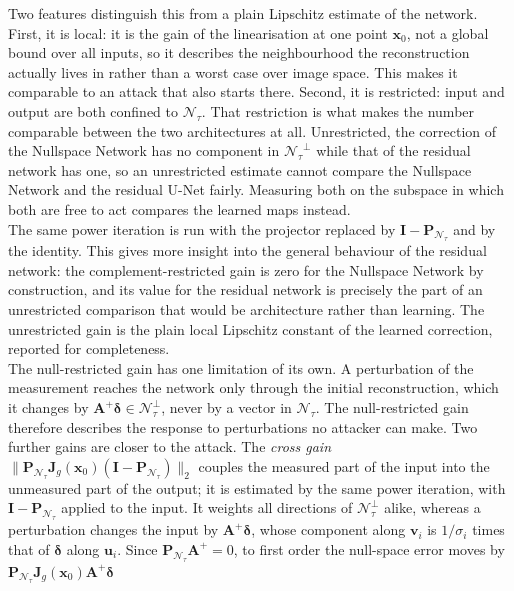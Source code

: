 \documentclass{article}
\numberwithin{equation}{section}
\begin{document}
Two features distinguish this from a plain Lipschitz estimate of the network.
First, it is local: it is the gain of the linearisation at one point
$\mathbf{x}_0$, not a global bound over all inputs, so it describes the
neighbourhood the reconstruction actually lives in rather than a worst case over
image space. This makes it comparable to an attack that also starts
there. Second, it is restricted: input and output are both confined to
$\mathcal{N}_\tau$. That restriction is what makes the number comparable
between the two architectures at all. Unrestricted, the correction of the Nullspace Network has no
component in ${\mathcal{N}_\tau}^{\perp}$ while that of the residual network has one,
so an unrestricted estimate cannot compare the Nullspace Network and the residual U-Net fairly.
Measuring both on the subspace in which both are free to act compares the learned maps instead.\\
The same power iteration is run with the projector replaced by
$\mathbf{I}-\mathbf{P}_{\mathcal{N}_\tau}$ and by the identity.
This gives more insight into the general behaviour of the residual network:
the complement-restricted gain is zero for the Nullspace Network by construction, and its value for the residual network is
precisely the part of an unrestricted comparison that would be architecture rather
than learning. The unrestricted gain is the plain local Lipschitz constant of the
learned correction, reported for completeness.\\
The null-restricted gain has one limitation of its own. A perturbation of the measurement reaches
the network only through the initial reconstruction, which it changes by
$\mathbf{A}^{+}\boldsymbol{\delta}\in\mathcal{N}_\tau^\perp$, never by a vector in
$\mathcal{N}_\tau$. The null-restricted gain therefore describes the response to perturbations
no attacker can make. Two further gains are closer to the attack. The \emph{cross gain}
$\lVert\mathbf{P}_{\mathcal{N}_\tau}\mathbf{J}_g(\mathbf{x}_0)(\mathbf{I}-\mathbf{P}_{\mathcal{N}_\tau})\rVert_2$
couples the measured part of the input into the unmeasured part of the output; it is estimated by the
same power iteration, with $\mathbf{I}-\mathbf{P}_{\mathcal{N}_\tau}$ applied to the input. It weights all
directions of $\mathcal{N}_\tau^\perp$ alike, whereas a perturbation changes the input by
$\mathbf{A}^{+}\boldsymbol{\delta}$, whose component along $\mathbf{v}_i$ is $1/\sigma_i$ times that of
$\boldsymbol{\delta}$ along $\mathbf{u}_i$. Since $\mathbf{P}_{\mathcal{N}_\tau}\mathbf{A}^{+}=0$, to first
order the null-space error moves by $\mathbf{P}_{\mathcal{N}_\tau}\mathbf{J}_g(\mathbf{x}_0)\mathbf{A}^{+}\boldsymbol{\delta}$
\end{document}

